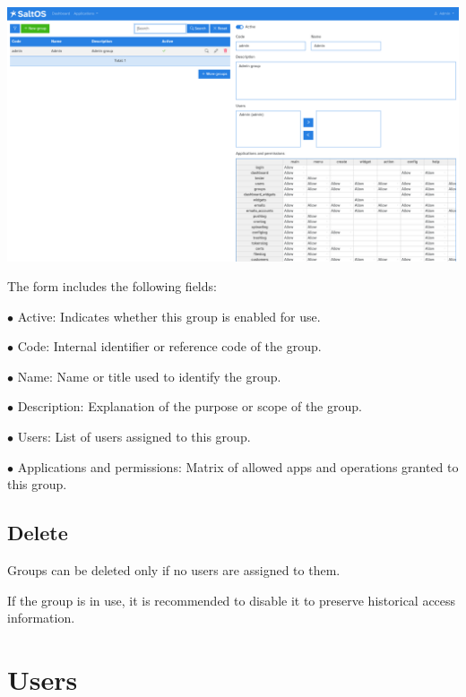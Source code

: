 \documentclass[a4paper]{article}
\begin{document}
\begin{center}\includegraphics[width=1\textwidth]{../ujest/snaps/test-screenshots-js-screenshots-users-groups-edit-1-en-us-1-snap.png}\end{center}

The form includes the following fields:

\begin{compactitem}
\item[\color{myblue}$\bullet$] Active: Indicates whether this group is enabled for use.
\item[\color{myblue}$\bullet$] Code: Internal identifier or reference code of the group.
\item[\color{myblue}$\bullet$] Name: Name or title used to identify the group.
\item[\color{myblue}$\bullet$] Description: Explanation of the purpose or scope of the group.
\item[\color{myblue}$\bullet$] Users: List of users assigned to this group.
\item[\color{myblue}$\bullet$] Applications and permissions: Matrix of allowed apps and operations granted to this group.
\end{compactitem}

\hypertarget{toc180}{}
\subsection{Delete}

Groups can be deleted only if no users are assigned to them.

If the group is in use, it is recommended to disable it to preserve historical access information.


\hypertarget{toc181}{}
\section{Users}
\end{document}
